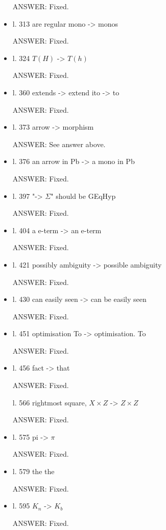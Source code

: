 \documentclass[english,11pt,a4paper]{article}
\begin{document}
\begin{itemize}
ANSWER: Fixed.

\item l. 313 are regular mono -> monos

ANSWER: Fixed.

\item l. 324 $T(H)$ -> $T(h)$

ANSWER: Fixed.

\item l. 360 extends -> extend
ito -> to

ANSWER: Fixed.

\item l. 373 arrow -> morphism

ANSWER: See answer above.

\item l. 376 an arrow in Pb -> a mono in Pb

ANSWER: Fixed.

\item l. 397 "-> $\Sigma$" should be GEqHyp

ANSWER: Fixed.

\item l. 404 a e-term -> an e-term

ANSWER: Fixed.

\item l. 421 possibly ambiguity -> possible ambiguity

ANSWER: Fixed.

\item l. 430 can easily seen -> can be easily seen

ANSWER: Fixed.

\item l. 451 optimisation To -> optimisation. To

ANSWER: Fixed.

\item l. 456 fact -> that

ANSWER: Fixed.

l. 566 rightmost square, $X\times Z$ -> $Z\times Z$

ANSWER: Fixed.

\item l. 575 pi -> $\pi$

ANSWER: Fixed.


\item l. 579 the the

ANSWER: Fixed.


\item l. 595 $K_n$ -> $K_b$

ANSWER: Fixed.


\end{itemize}
\end{document}
